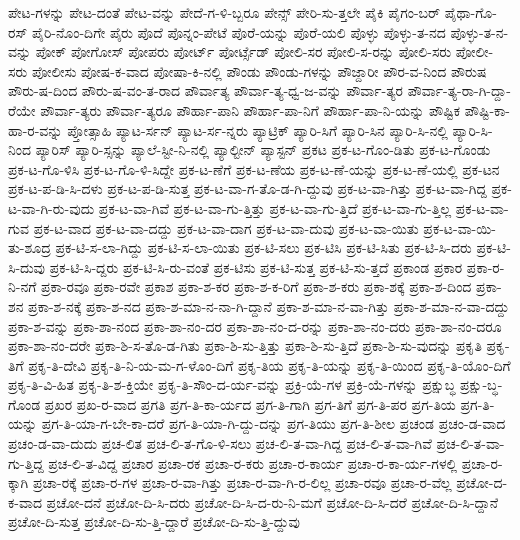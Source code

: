 {ಪೇಟ-ಗಳನ್ನು
ಪೇಟ-ದಂತೆ
ಪೇಟ-ವನ್ನು
ಪೇದೆ-ಗ-ಳಿ-ಬ್ಬರೂ
ಪೇನ್ಸ್
ಪೇರಿ-ಸು-ತ್ತಲೇ
ಪೈಕಿ
ಪೈಗಂ-ಬರ್
ಪೈಥಾ-ಗೊ-ರಸ್
ಪೈರಿ-ನೊಂ-ದಿಗೇ
ಪೈರು
ಪೊದೆ
ಪೊನ್ನಂ-ಪೇಟೆ
ಪೊರೆ-ಯನ್ನು
ಪೊರೆ-ಯಲಿ
ಪೊಳ್ಳು
ಪೊಳ್ಳು-ತ-ನದ
ಪೊಳ್ಳು-ತ-ನ-ವನ್ನು
ಪೋಕ್
ಪೋಗೋಸ್
ಪೋಪರು
ಪೋರ್ಟ್
ಪೋರ್ಟ್ಸೆಡ್
ಪೋಲಿ-ಸರ
ಪೋಲಿ-ಸ-ರನ್ನು
ಪೋಲಿ-ಸರು
ಪೋಲೀ-ಸರು
ಪೋಲೀಸು
ಪೋಷ-ಕ-ವಾದ
ಪೋಷಾ-ಕಿ-ನಲ್ಲಿ
ಪೌಂಡು
ಪೌಂಡು-ಗಳನ್ನು
ಪೌಜ್ದಾರೀ
ಪೌರ-ವ-ನಿಂದ
ಪೌರುಷ
ಪೌರು-ಷ-ದಿಂದ
ಪೌರು-ಷ-ವಂ-ತ-ರಾದ
ಪೌರ್ವಾತ್ಯ
ಪೌರ್ವಾ-ತ್ಯ-ಧ್ವ-ಜ-ವನ್ನು
ಪೌರ್ವಾ-ತ್ಯರ
ಪೌರ್ವಾ-ತ್ಯ-ರಾ-ಗಿ-ದ್ದಾ-ರೆಯೇ
ಪೌರ್ವಾ-ತ್ಯರು
ಪೌರ್ವಾ-ತ್ಯರೂ
ಪೌರ್ಹಾ-ಪಾನಿ
ಪೌರ್ಹಾ-ಪಾ-ನಿಗೆ
ಪೌರ್ಹಾ-ಪಾ-ನಿ-ಯನ್ನು
ಪೌಷ್ಟಿಕ
ಪೌಷ್ಟಿ-ಕಾ-ಹಾ-ರ-ವನ್ನು
ಪ್ತೋತ್ಸಾಹಿ
ಪ್ಯಾಟ-ರ್ಸನ್
ಪ್ಯಾಟ-ರ್ಸ-ನ್ನರು
ಪ್ಯಾಟ್ರಿಕ್
ಪ್ಯಾರಿ-ಸಿಗೆ
ಪ್ಯಾರಿ-ಸಿನ
ಪ್ಯಾರಿ-ಸಿ-ನಲ್ಲಿ
ಪ್ಯಾರಿ-ಸಿ-ನಿಂದ
ಪ್ಯಾರಿಸ್
ಪ್ಯಾರಿ-ಸ್ಸನ್ನು
ಪ್ಯಾಲೆ-ಸ್ಟೀ-ನಿ-ನಲ್ಲಿ
ಪ್ಯಾಲ್ಟೀನ್
ಪ್ಯಾಸ್ಟನ್
ಪ್ರಕಟ
ಪ್ರಕ-ಟ-ಗೊಂ-ಡಿತು
ಪ್ರಕ-ಟ-ಗೊಂಡು
ಪ್ರಕ-ಟ-ಗೊ-ಳಿಸಿ
ಪ್ರಕ-ಟ-ಗೊ-ಳಿ-ಸಿದ್ದೇ
ಪ್ರಕ-ಟ-ಣೆಗೆ
ಪ್ರಕ-ಟ-ಣೆಯ
ಪ್ರಕ-ಟ-ಣೆ-ಯನ್ನು
ಪ್ರಕ-ಟ-ಣೆ-ಯಲ್ಲಿ
ಪ್ರಕ-ಟನ
ಪ್ರಕ-ಟ-ಪ-ಡಿ-ಸಿ-ದಳು
ಪ್ರಕ-ಟ-ಪ-ಡಿ-ಸುತ್ತ
ಪ್ರಕ-ಟ-ವಾ-ಗ-ತೊ-ಡ-ಗಿ-ದ್ದುವು
ಪ್ರಕ-ಟ-ವಾ-ಗಿತ್ತು
ಪ್ರಕ-ಟ-ವಾ-ಗಿದ್ದ
ಪ್ರಕ-ಟ-ವಾ-ಗಿ-ರು-ವುದು
ಪ್ರಕ-ಟ-ವಾ-ಗಿವೆ
ಪ್ರಕ-ಟ-ವಾ-ಗು-ತ್ತಿತ್ತು
ಪ್ರಕ-ಟ-ವಾ-ಗು-ತ್ತಿದೆ
ಪ್ರಕ-ಟ-ವಾ-ಗು-ತ್ತಿಲ್ಲ
ಪ್ರಕ-ಟ-ವಾ-ಗುವ
ಪ್ರಕ-ಟ-ವಾದ
ಪ್ರಕ-ಟ-ವಾ-ದದ್ದು
ಪ್ರಕ-ಟ-ವಾ-ದಾಗ
ಪ್ರಕ-ಟ-ವಾ-ದುವು
ಪ್ರಕ-ಟ-ವಾ-ಯಿತು
ಪ್ರಕ-ಟ-ವಾ-ಯಿ-ತು-ಶೂದ್ರ
ಪ್ರಕ-ಟಿ-ಸ-ಲಾ-ಗಿದ್ದು
ಪ್ರಕ-ಟಿ-ಸ-ಲಾ-ಯಿತು
ಪ್ರಕ-ಟಿ-ಸಲು
ಪ್ರಕ-ಟಿಸಿ
ಪ್ರಕ-ಟಿ-ಸಿತು
ಪ್ರಕ-ಟಿ-ಸಿ-ದರು
ಪ್ರಕ-ಟಿ-ಸಿ-ದುವು
ಪ್ರಕ-ಟಿ-ಸಿ-ದ್ದರು
ಪ್ರಕ-ಟಿ-ಸಿ-ರು-ವಂತೆ
ಪ್ರಕ-ಟಿಸು
ಪ್ರಕ-ಟಿ-ಸುತ್ತ
ಪ್ರಕ-ಟಿ-ಸು-ತ್ತದೆ
ಪ್ರಕಾಂಡ
ಪ್ರಕಾರ
ಪ್ರಕಾ-ರ-ನಿ-ನಗೆ
ಪ್ರಕಾ-ರವೂ
ಪ್ರಕಾ-ರವೇ
ಪ್ರಕಾಶ
ಪ್ರಕಾ-ಶ-ಕರ
ಪ್ರಕಾ-ಶ-ಕ-ರಿಗೆ
ಪ್ರಕಾ-ಶ-ಕರು
ಪ್ರಕಾ-ಶಕ್ಕೆ
ಪ್ರಕಾ-ಶ-ದಿಂದ
ಪ್ರಕಾ-ಶನ
ಪ್ರಕಾ-ಶ-ನಕ್ಕೆ
ಪ್ರಕಾ-ಶ-ನದ
ಪ್ರಕಾ-ಶ-ಮಾ-ನ-ನಾ-ಗಿ-ದ್ದಾನೆ
ಪ್ರಕಾ-ಶ-ಮಾ-ನ-ವಾ-ಗಿತ್ತು
ಪ್ರಕಾ-ಶ-ಮಾ-ನ-ವಾ-ದದ್ದು
ಪ್ರಕಾ-ಶ-ವನ್ನು
ಪ್ರಕಾ-ಶಾ-ನಂದ
ಪ್ರಕಾ-ಶಾ-ನಂ-ದರ
ಪ್ರಕಾ-ಶಾ-ನಂ-ದ-ರನ್ನು
ಪ್ರಕಾ-ಶಾ-ನಂ-ದರು
ಪ್ರಕಾ-ಶಾ-ನಂ-ದರೂ
ಪ್ರಕಾ-ಶಾ-ನಂ-ದರೇ
ಪ್ರಕಾ-ಶಿ-ಸ-ತೊ-ಡ-ಗಿತು
ಪ್ರಕಾ-ಶಿ-ಸು-ತ್ತಿತ್ತು
ಪ್ರಕಾ-ಶಿ-ಸು-ತ್ತಿದೆ
ಪ್ರಕಾ-ಶಿ-ಸು-ವುದನ್ನು
ಪ್ರಕೃತಿ
ಪ್ರಕೃ-ತಿಗೆ
ಪ್ರಕೃ-ತಿ-ದೇವಿ
ಪ್ರಕೃ-ತಿ-ನಿ-ಯ-ಮ-ಗ-ಳೊಂ-ದಿಗೆ
ಪ್ರಕೃ-ತಿಯ
ಪ್ರಕೃ-ತಿ-ಯನ್ನು
ಪ್ರಕೃ-ತಿ-ಯಿಂದ
ಪ್ರಕೃ-ತಿ-ಯೊಂ-ದಿಗೆ
ಪ್ರಕೃ-ತಿ-ವಿ-ಹಿತ
ಪ್ರಕೃ-ತಿ-ಶ-ಕ್ತಿಯೇ
ಪ್ರಕೃ-ತಿ-ಸೌಂ-ದ-ರ್ಯ-ವನ್ನು
ಪ್ರಕ್ರಿ-ಯೆ-ಗಳ
ಪ್ರಕ್ರಿ-ಯೆ-ಗಳನ್ನು
ಪ್ರಕ್ಷುಬ್ಧ
ಪ್ರಕ್ಷು-ಬ್ಧ-ಗೊಂಡ
ಪ್ರಖರ
ಪ್ರಖ-ರ-ವಾದ
ಪ್ರಗತಿ
ಪ್ರಗ-ತಿ-ಕಾ-ರ್ಯದ
ಪ್ರಗ-ತಿ-ಗಾಗಿ
ಪ್ರಗ-ತಿಗೆ
ಪ್ರಗ-ತಿ-ಪರ
ಪ್ರಗ-ತಿಯ
ಪ್ರಗ-ತಿ-ಯನ್ನು
ಪ್ರಗ-ತಿ-ಯಾ-ಗ-ಬೇ-ಕಾ-ದರೆ
ಪ್ರಗ-ತಿ-ಯಾ-ಗಿ-ದ್ದು-ದನ್ನು
ಪ್ರಗ-ತಿಯು
ಪ್ರಗ-ತಿ-ಶೀಲ
ಪ್ರಚಂಡ
ಪ್ರಚಂ-ಡ-ವಾದ
ಪ್ರಚಂ-ಡ-ವಾ-ದುದು
ಪ್ರಚ-ಲಿತ
ಪ್ರಚ-ಲಿ-ತ-ಗೊ-ಳಿ-ಸಲು
ಪ್ರಚ-ಲಿ-ತ-ವಾ-ಗಿದ್ದ
ಪ್ರಚ-ಲಿ-ತ-ವಾ-ಗಿವೆ
ಪ್ರಚ-ಲಿ-ತ-ವಾ-ಗು-ತ್ತಿದ್ದ
ಪ್ರಚ-ಲಿ-ತ-ವಿದ್ದ
ಪ್ರಚಾರ
ಪ್ರಚಾ-ರಕ
ಪ್ರಚಾ-ರ-ಕರು
ಪ್ರಚಾ-ರ-ಕಾರ್ಯ
ಪ್ರಚಾ-ರ-ಕಾ-ರ್ಯ-ಗಳಲ್ಲಿ
ಪ್ರಚಾ-ರ-ಕ್ಕಾಗಿ
ಪ್ರಚಾ-ರಕ್ಕೆ
ಪ್ರಚಾ-ರ-ಗಳ
ಪ್ರಚಾ-ರ-ವಾ-ಗಿತ್ತು
ಪ್ರಚಾ-ರ-ವಾ-ಗಿ-ರ-ಲಿಲ್ಲ
ಪ್ರಚಾ-ರವೂ
ಪ್ರಚಾ-ರ-ವೆಲ್ಲ
ಪ್ರಚೋ-ದ-ಕ-ವಾದ
ಪ್ರಚೋ-ದನೆ
ಪ್ರಚೋ-ದಿ-ಸಿ-ದರು
ಪ್ರಚೋ-ದಿ-ಸಿ-ದ-ರು-ನಿ-ಮಗೆ
ಪ್ರಚೋ-ದಿ-ಸಿ-ದರೆ
ಪ್ರಚೋ-ದಿ-ಸಿ-ದ್ದಾನೆ
ಪ್ರಚೋ-ದಿ-ಸುತ್ತ
ಪ್ರಚೋ-ದಿ-ಸು-ತ್ತಿ-ದ್ದಾರೆ
ಪ್ರಚೋ-ದಿ-ಸು-ತ್ತಿ-ದ್ದುವು
}
